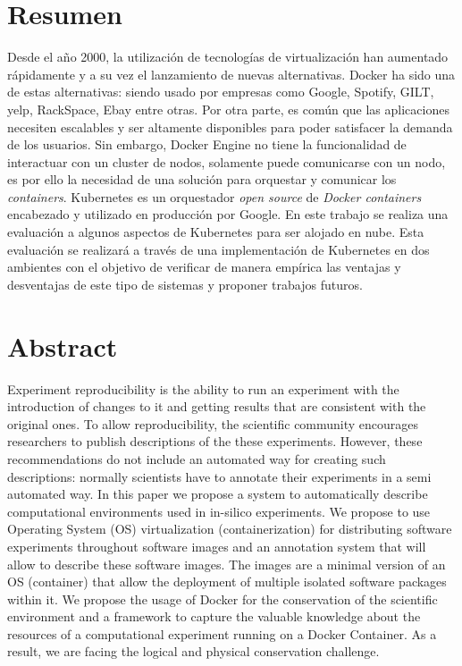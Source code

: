 

\section*{Resumen}


Desde el año 2000, la utilización de tecnologías de virtualización han aumentado rápidamente y a su vez el lanzamiento de nuevas
alternativas. Docker ha sido una de estas alternativas: siendo usado por empresas como Google, Spotify, GILT, yelp, RackSpace, Ebay entre otras. 
Por otra parte, es común que las aplicaciones necesiten escalables y ser altamente disponibles para poder satisfacer la demanda de los usuarios. Sin embargo, Docker Engine no tiene la funcionalidad de interactuar con un cluster de nodos, solamente puede comunicarse con un nodo, es por ello la necesidad de una solución para orquestar y comunicar los \textit{containers}. Kubernetes es un orquestador \textit{open source} de \textit{Docker containers } encabezado y utilizado en producción por Google. En este trabajo se realiza una evaluación a algunos aspectos de Kubernetes para ser alojado en nube. Esta evaluación se realizará a través de una implementación de Kubernetes en dos ambientes con el objetivo de verificar de manera empírica las ventajas y desventajas de este tipo de sistemas y proponer trabajos futuros. 
\section*{Abstract}
% 
Experiment reproducibility is the ability to run an experiment with the introduction of changes to it and getting results that are consistent with the original ones. To allow reproducibility, the scientific community encourages researchers to publish descriptions of the these experiments. However, these recommendations do not include an automated way for creating such descriptions: normally scientists have to annotate their experiments in a semi automated way. In this paper we propose a system to automatically describe computational environments used in in-silico experiments. We propose to use Operating System (OS) virtualization (containerization) for distributing software experiments throughout software images and an annotation system that will allow to describe these software images. The images are a minimal version of an OS (container) that allow the deployment of multiple isolated software packages within it. 
We propose the usage of Docker for the conservation of the scientific environment and a framework to capture the valuable knowledge about the resources of a computational experiment running on a Docker Container. As a result, we are facing the logical and physical conservation challenge. 